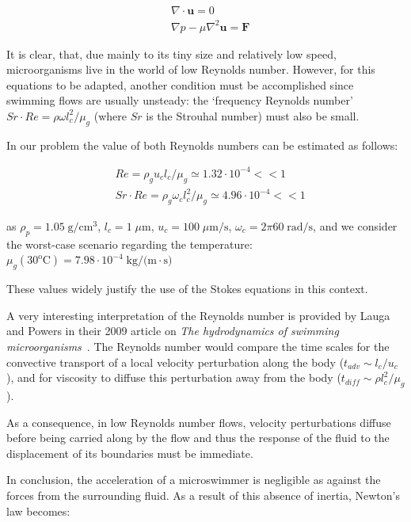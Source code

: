 \begin{equation}
\begin{aligned} & \nabla \cdot \mathbf{u}=0 \\
& \nabla p-\mu \nabla^{2} \mathbf{u}=\mathbf{F} \label{stokes_f} \end{aligned}
\end{equation}

It is clear, that, due mainly to its tiny size and relatively low speed, microorganisms live in the world of low Reynolds number. However, for this equations to be adapted, another condition must be accomplished since swimming flows are usually unsteady: the ‘frequency Reynolds number’ $Sr \cdot Re = \rho \omega l_c^2/ \mu_g$ (where $Sr$ is the Strouhal number) must also be small.

In our problem the value of both Reynolds numbers can be estimated as follows:

\begin{equation}
	\begin{aligned} & Re = \rho_g u_c l_c/\mu_g \simeq 1.32 \cdot 10^{-4} << 1\\
	& Sr \cdot Re = \rho_g \omega_cl_c^2/ \mu_g \simeq 4.96 \cdot 10^{-4} << 1 \end{aligned}
\end{equation}

as $\rho_p = 1.05 \; \textrm{g/} \textrm{cm}^\textrm{3}$, $l_c = 1 \; \mu \textrm{m}$,  $u_c = 100 \; \mu \textrm{m/s}$,  $\omega_c = 2 \pi 60 \; \textrm{rad/s}$, and we consider the worst-case scenario regarding the temperature: $\mu_g(30^\textrm{o}\textrm{C}) = 7.98 \cdot 10^{-4} \; \textrm{kg/(m} \cdot \textrm{s)}$

These values widely justify the use of the Stokes equations in this context.

A very interesting interpretation of the Reynolds number is provided by Lauga and Powers in their 2009 article on \textit{The hydrodynamics of swimming microorganisms}~\cite{Lauga}. The Reynolds number would compare the time scales for the convective transport of a local velocity perturbation along the body ($t_{adv} \sim l_c/u_c$), and for viscosity to diffuse this perturbation  away from the body ($t_{diff} \sim ρl_c^2/ \mu_g$). 

As a consequence, in low Reynolds number flows, velocity perturbations diffuse before being carried along by the flow and thus the response of the fluid to the displacement of its boundaries must be immediate. 

In conclusion, the acceleration of a microswimmer is negligible as against the forces from the surrounding fluid. As a result of this absence of inertia, Newton’s law becomes:

